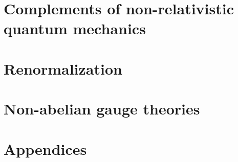 \documentclass[fontsize=10pt,%
               a4paper,%
               twoside,%
               openright,%
               titlepage,%
               fleqn,%
               headinclude=true,%
               footinclude=true,%
               BCOR5mm,%
               numbers=noenddot,%
               cleardoublepage=empty,%
               captions=tableheading,%
               version=first,english,%
               abstracton%
               ]{scrreprt}                %
\begin{document}
\pagestyle{plain}



%
%
%
\pagestyle{scrheadings} 



\cleardoublepage
\cleardoublepage
{}
\cleardoublepage
\cleardoublepage
\part{Complements of non-relativistic quantum mechanics}

\cleardoublepage
\part{Renormalization}
%
%
%
%
%
\cleardoublepage
\part{Non-abelian gauge theories}
\cleardoublepage
\part{Appendices}
\appendix



%
%


\end{document}
